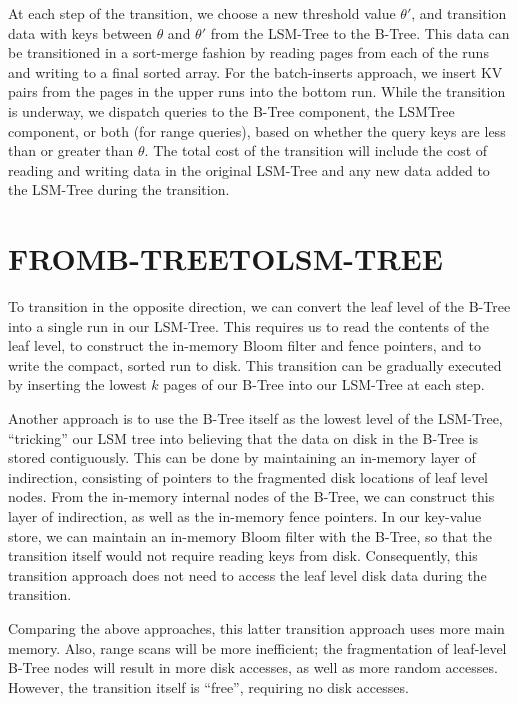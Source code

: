 \documentclass[a4paper,12pt,notitlepage,twoside,openright]{article}
\begin{document}
At each step of the transition, we choose a new threshold value
\(\theta'\), and transition data with keys between
\( \theta \) and \(\theta'\) from the LSM-Tree to the
B-Tree. This data can be transitioned in a sort-merge fashion by reading
pages from each of the runs and writing to a final sorted array. For the
batch-inserts approach, we insert KV pairs from the pages in the upper
runs into the bottom run. While the transition is underway, we dispatch
queries to the B-Tree component, the LSMTree component, or both (for
range queries), based on whether the query keys are less than or greater
than \( \theta \). The total cost of the transition will include the cost of
reading and writing data in the original LSM-Tree and any new data added
to the LSM-Tree during the transition.

\hypertarget{fromb-treetolsm-tree}{%
\section{FROMB-TREETOLSM-TREE}\label{fromb-treetolsm-tree}}

To transition in the opposite direction, we can convert the leaf level
of the B-Tree into a single run in our LSM-Tree. This requires us to
read the contents of the leaf level, to construct the in-memory Bloom
filter and fence pointers, and to write the compact, sorted run to disk.
This transition can be gradually executed by inserting the lowest
\(k\) pages of our B-Tree into our LSM-Tree at each step.

Another approach is to use the B-Tree itself as the lowest level of the
LSM-Tree, ``tricking'' our LSM tree into believing that the data on disk
in the B-Tree is stored contiguously. This can be done by maintaining an
in-memory layer of indirection, consisting of pointers to the fragmented
disk locations of leaf level nodes. From the in-memory internal nodes of
the B-Tree, we can construct this layer of indirection, as well as the
in-memory fence pointers. In our key-value store, we can maintain an
in-memory Bloom filter with the B-Tree, so that the transition itself
would not require reading keys from disk. Consequently, this transition
approach does not need to access the leaf level disk data during the
transition.

Comparing the above approaches, this latter transition approach uses
more main memory. Also, range scans will be more inefficient; the
fragmentation of leaf-level B-Tree nodes will result in more disk
accesses, as well as more random accesses. However, the transition
itself is ``free'', requiring no disk accesses.
\end{document}
